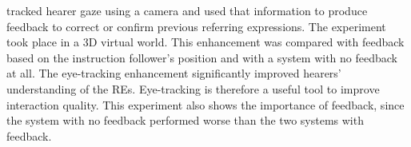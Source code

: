 \citet{koller2012enhancing} tracked hearer gaze using a camera and used that information to produce feedback to correct or confirm previous referring expressions. The experiment took place in a 3D virtual world. This enhancement was compared with feedback based on the instruction follower's position and with a system with no feedback at all. The eye-tracking enhancement significantly improved hearers' understanding of the REs. Eye-tracking is therefore a useful tool to improve interaction quality. This experiment also shows the importance of feedback, since the system with no feedback performed worse than the two systems with feedback.